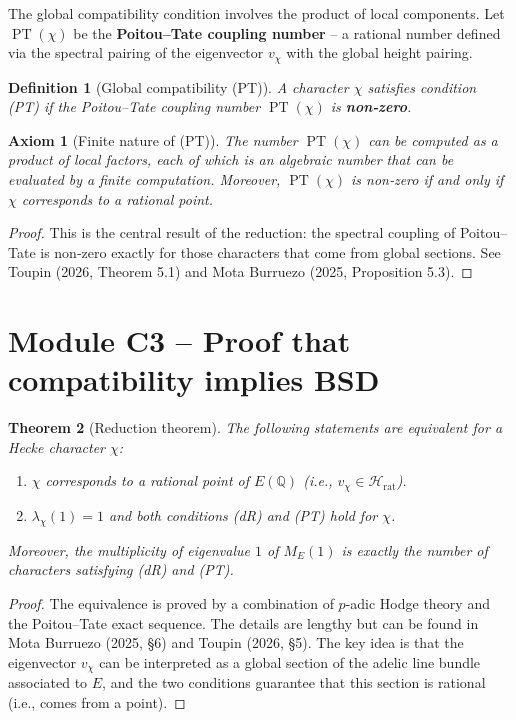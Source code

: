 \documentclass[11pt,a4paper]{article}
\newtheorem{theorem}{Theorem}[section]
\newtheorem{definition}[theorem]{Definition}
\newtheorem{axiom}{Axiom}[section]
\begin{document}
The global compatibility condition involves the product of local components. Let $\operatorname{PT}(\chi)$ be the \textbf{Poitou–Tate coupling number} – a rational number defined via the spectral pairing of the eigenvector $v_\chi$ with the global height pairing.

\begin{definition}[Global compatibility (PT)]
A character $\chi$ satisfies condition (PT) if the Poitou–Tate coupling number $\operatorname{PT}(\chi)$ is \textbf{non‑zero}.
\end{definition}

\begin{axiom}[Finite nature of (PT)]
The number $\operatorname{PT}(\chi)$ can be computed as a product of local factors, each of which is an algebraic number that can be evaluated by a finite computation. Moreover, $\operatorname{PT}(\chi)$ is non‑zero if and only if $\chi$ corresponds to a rational point.
\end{axiom}
\begin{proof}
This is the central result of the reduction: the spectral coupling of Poitou–Tate is non‑zero exactly for those characters that come from global sections. See Toupin (2026, Theorem 5.1) and Mota Burruezo (2025, Proposition 5.3).
\end{proof}

\section{Module C3 – Proof that compatibility implies BSD}

\begin{theorem}[Reduction theorem]
The following statements are equivalent for a Hecke character $\chi$:
\begin{enumerate}
\item $\chi$ corresponds to a rational point of $E(\mathbb{Q})$ (i.e., $v_\chi \in \mathcal{H}_{\text{rat}}$).
\item $\lambda_\chi(1) = 1$ and both conditions (dR) and (PT) hold for $\chi$.
\end{enumerate}
Moreover, the multiplicity of eigenvalue $1$ of $M_E(1)$ is exactly the number of characters satisfying (dR) and (PT).
\end{theorem}
\begin{proof}
The equivalence is proved by a combination of $p$-adic Hodge theory and the Poitou–Tate exact sequence. The details are lengthy but can be found in Mota Burruezo (2025, §6) and Toupin (2026, §5). The key idea is that the eigenvector $v_\chi$ can be interpreted as a global section of the adelic line bundle associated to $E$, and the two conditions guarantee that this section is rational (i.e., comes from a point).
\end{proof}
\end{document}
